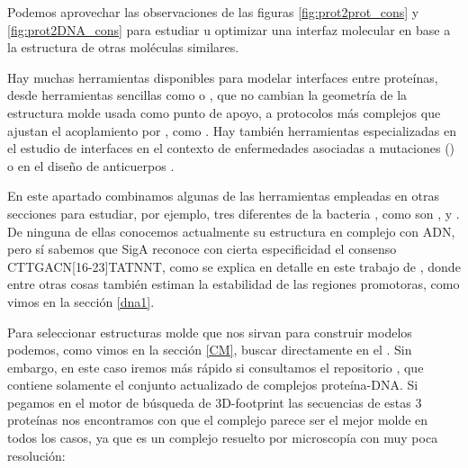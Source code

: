 Podemos aprovechar las observaciones de las figuras \ref{fig:prot2prot_cons} y \ref{fig:prot2DNA_cons} 
para estudiar u optimizar una interfaz molecular en base a la estructura de otras mol\'{e}culas similares.

Hay muchas herramientas disponibles para modelar interfaces entre prote\'{i}nas,
desde herramientas sencillas como 
 o
,
que no cambian la geometr\'{i}a de la estructura molde usada como punto de apoyo,
a protocolos m\'{a}s complejos que ajustan el acoplamiento por ,
como .
Hay tambi\'{e}n herramientas especializadas en el estudio de interfaces en el contexto
de enfermedades asociadas a mutaciones ()
o en el dise\~{n}o de anticuerpos \citep{Lapidoth2015,Baran2017}.

En este apartado combinamos algunas de las herramientas empleadas en otras secciones para estudiar, por ejemplo, tres diferentes 
de la bacteria , 
como son ,
 y
.
De ninguna de ellas conocemos actualmente su estructura en complejo con ADN,
pero s\'{i} sabemos que SigA reconoce con cierta especificidad el consenso CTTGACN[16-23]TATNNT, 
como se explica en detalle en este trabajo de \cite{RamirezRomero2006}, 
donde entre otras cosas tambi\'{e}n estiman la estabilidad
de las regiones promotoras, como vimos en la secci\'{o}n \ref{dna1}.

Para seleccionar estructuras molde que nos sirvan para construir modelos podemos,
como vimos en la secci\'{o}n \ref{CM}, buscar directamente en el .
Sin embargo, en este caso iremos m\'{a}s r\'{a}pido si consultamos el repositorio 
 \citep{ContrerasMoreira2010}, 
que contiene solamente el conjunto actualizado de complejos prote\'{i}na-DNA.
Si pegamos en el motor de b\'{u}squeda de 3D-footprint las secuencias de estas 3 prote\'{i}nas
nos encontramos con que el complejo 
parece ser el mejor molde en todos los casos, ya que 
es un complejo resuelto por microscop\'{i}a con muy poca resoluci\'{o}n:



